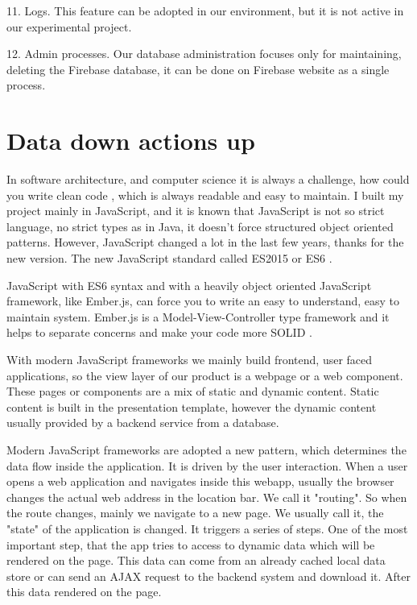 \documentclass[12pt, a4paper, oneside, openright, medskipamount]{report}
\begin{document}
11. Logs. This feature can be adopted in our environment, but it is not active in our experimental project.

12. Admin processes. Our database administration focuses only for maintaining, deleting the Firebase database, it can be done on Firebase website as a single process.

\section{Data down actions up}

In software architecture, and computer science it is always a challenge, how could you write clean code \cite{clean-code}, which is always readable and easy to maintain. I built my project mainly in JavaScript, and it is known that JavaScript is not so strict language, no strict types as in Java, it doesn't force structured object oriented patterns. However, JavaScript changed a lot in the last few years, thanks for the new version. The new JavaScript standard called ES2015 or ES6 \cite{es6}.

JavaScript with ES6 syntax and with a heavily object oriented JavaScript framework, like Ember.js, can force you to write an easy to understand, easy to maintain system. Ember.js is a Model-View-Controller type framework and it helps to separate concerns and make your code more SOLID \cite{solid}.

With modern JavaScript frameworks we mainly build frontend, user faced applications, so the view layer of our product is a webpage or a web component. These pages or components are a mix of static and dynamic content. Static content is built in the presentation template, however the dynamic content usually provided by a backend service from a database.

Modern JavaScript frameworks are adopted a new pattern, which determines the data flow inside the application. It is driven by the user interaction. When a user opens a web application and navigates inside this webapp, usually the browser changes the actual web address in the location bar. We call it "routing". So when the route changes, mainly we navigate to a new page. We usually call it, the "state" of the application is changed. It triggers a series of steps. One of the most important step, that the app tries to access to dynamic data which will be rendered on the page. This data can come from an already cached local data store or can send an AJAX request to the backend system and download it. After this data rendered on the page.
\end{document}
